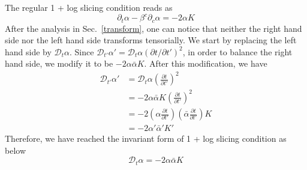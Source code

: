 \documentclass[letterpaper,nofootinbib,prd,amsmath,onecolumn]{revtex4-1}
\begin{document}
The regular 1 + log slicing condition reads as
\begin{equation}
\partial_{t}\alpha - \beta^{c}\partial_{c}\alpha = -2\alpha K
\end{equation}
After the analysis in Sec.~\ref{transform}, one can notice that neither the right hand side nor the left hand side transforms tensorially. We start by replacing the left hand side by $\mathscr{D}_{t}\alpha$. Since $\mathscr{D}_{t'}\alpha' = \mathscr{D}_{t}\alpha(\partial t/\partial t')^{2}$, in order to balance the right hand side, we modify it to be $-2\alpha {\bar \alpha}K$. After this modification, we have
\begin{align*}
\mathscr{D}_{t'}\alpha' & = \mathscr{D}_{t}\alpha\left(\frac{\partial t}{\partial t'}\right)^{2}\\
& = -2\alpha{\bar \alpha}K\left(\frac{\partial t}{\partial t'}\right)^{2}\\
& = -2\left(\alpha\frac{\partial t}{\partial t'}\right)\left({\bar \alpha}\frac{\partial t}{\partial t'}\right)K\\
& = -2\alpha'{\bar \alpha}'K'
\end{align*}
Therefore, we have reached the invariant form of 1 + log slicing condition as below
\begin{equation}\label{invariant 1 + log slicing}
\mathscr{D}_{t}\alpha = -2\alpha{\bar \alpha}K
\end{equation}
\end{document}
